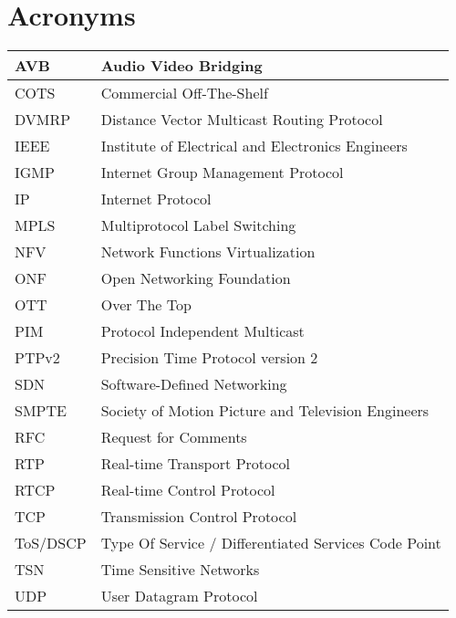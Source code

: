 \cleardoublepage
{}
\chapter*{Acronyms}

\begin{table*}[htb]
\centering
\begin{tabular}{p{} p{}}
\hline
AVB & Audio Video Bridging \\
\hline
COTS & Commercial Off-The-Shelf \\
\hline
DVMRP & Distance Vector Multicast Routing Protocol \\
\hline
IEEE & Institute of Electrical and Electronics Engineers \\
\hline
IGMP & Internet Group Management Protocol \\
\hline
IP & Internet Protocol \\
\hline
MPLS & Multiprotocol Label Switching \\
\hline
NFV & Network Functions Virtualization \\
\hline
ONF & Open Networking Foundation \\
\hline
OTT & Over The Top \\
\hline
PIM & Protocol Independent Multicast \\
\hline
PTPv2 & Precision Time Protocol version 2 \\
\hline
SDN & Software-Defined Networking \\
\hline
SMPTE & Society of Motion Picture and Television Engineers \\
\hline
RFC & Request for Comments \\
\hline
RTP & Real-time Transport Protocol \\
\hline
RTCP & Real-time Control Protocol  \\
\hline
TCP & Transmission Control Protocol \\
\hline
ToS/DSCP & Type Of Service / Differentiated Services Code Point \\
\hline
TSN & Time Sensitive Networks \\
\hline
UDP & User Datagram Protocol \\
\hline
\end{tabular}
\end{table*}


